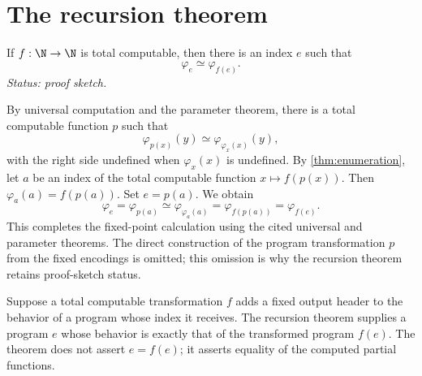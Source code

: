 \section{The recursion theorem}
\label{sec:universal-reductions-04}

\begin{theorem}
\label{thm:recursion-theorem}
If \(f:\N\to\N\) is total computable, then there is an index \(e\) such that
\[
  \varphi_e\simeq\varphi_{f(e)}.
\]
\textit{Status: proof sketch.}
\end{theorem}

\begin{proofplan}
By universal computation and the parameter theorem, there is a total
computable function \(p\) such that
\[
  \varphi_{p(x)}(y)\simeq\varphi_{\varphi_x(x)}(y),
\]
with the right side undefined when \(\varphi_x(x)\) is undefined.  By
\cref{thm:enumeration}, let \(a\)
be an index of the total computable function \(x\mapsto f(p(x))\).  Then
\(\varphi_a(a)=f(p(a))\).  Set \(e=p(a)\).  We obtain
\[
  \varphi_e
  =\varphi_{p(a)}
  \simeq\varphi_{\varphi_a(a)}
  =\varphi_{f(p(a))}
  =\varphi_{f(e)}.
\]
This completes the fixed-point calculation using the cited universal and
parameter theorems.  The direct construction of the program transformation
\(p\) from the fixed encodings is omitted; this omission is why the recursion
theorem retains proof-sketch status.
\end{proofplan}

\begin{example}
Suppose a total computable transformation \(f\) adds a fixed output header to
the behavior of a program whose index it receives.  The recursion theorem
supplies a program \(e\) whose behavior is exactly that of the transformed
program \(f(e)\).  The theorem does not assert \(e=f(e)\); it asserts equality
of the computed partial functions.
\end{example}

